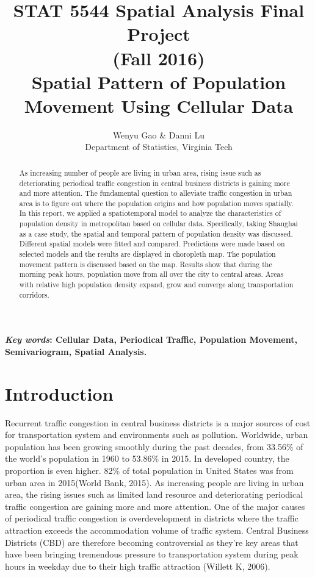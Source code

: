 \documentclass[hidelinks,12pt]{article}
\date{}
\author{Wenyu Gao \& Danni Lu \\ Department of Statistics, Virginia Tech}
\title{STAT 5544 Spatial Analysis Final Project \\ (Fall 2016) \\ Spatial Pattern of Population Movement Using Cellular Data }
\begin{document}
	\maketitle
	
	\begin{abstract}
		As increasing number of people are living in urban area, rising issue such as deteriorating periodical traffic congestion in central business districts is gaining more and more attention. The fundamental question to alleviate traffic congestion in urban area is to figure out where the population origins and how population moves spatially. In this report, we applied a spatiotemporal model to analyze the characteristics of population density in metropolitan based on cellular data. Specifically, taking Shanghai as a case study, the spatial and temporal pattern of population density was discussed. Different spatial models were fitted and compared. Predictions were made based on selected models and the results are displayed in choropleth map. The population movement pattern is discussed based on the map. Results show that during the morning peak hours, population move from all over the city to central areas. Areas with relative high population density expand, grow and converge along transportation corridors. 
	\end{abstract}
	\textbf{ {\em Key words}: Cellular Data, Periodical Traffic, Population Movement, Semivariogram, Spatial Analysis.}
	
	\section{Introduction}\label{sec:intro}
	Recurrent traffic congestion in central business districts is a major sources of cost for transportation system and environments such as pollution. Worldwide, urban population has been growing smoothly during the past decades, from 33.56\% of the world’s population in 1960 to 53.86\% in 2015. In developed country, the proportion is even higher. 82\% of total population in United States was from urban area in 2015(World Bank, 2015). As increasing people are living in urban area, the rising issues such as limited land resource and deteriorating periodical traffic congestion are gaining more and more attention. One of the major causes of periodical traffic congestion is overdevelopment in districts where the traffic attraction exceeds the accommodation volume of traffic system. Central Business Districts (CBD) are therefore becoming controversial as they’re key areas that have been bringing tremendous pressure to transportation system during peak hours in weekday due to their high traffic attraction (Willett K, 2006). 
	
\end{document}
